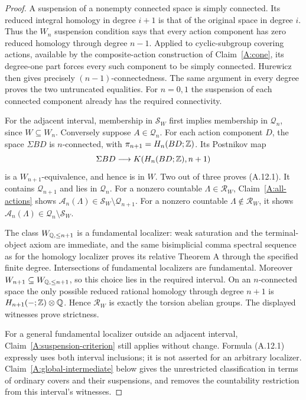 \begin{proof}
A suspension of a nonempty connected space is simply connected. Its reduced integral homology in degree $i+1$ is that of the original space in degree $i$. Thus the $W_n$ suspension condition says that every action component has zero reduced homology through degree $n-1$. Applied to cyclic-subgroup covering actions, available by the composite-action construction of Claim~\ref{A:cone}, its degree-one part forces every such component to be simply connected. Hurewicz then gives precisely $(n-1)$-connectedness. The same argument in every degree proves the two untruncated equalities. For $n=0,1$ the suspension of each connected component already has the required connectivity.

For the adjacent interval, membership in $\mathcal S_W$ first implies membership in $\mathcal Q_n$, since $W\subseteq W_n$. Conversely suppose $A\in\mathcal Q_n$. For each action component $D$, the space $\Sigma BD$ is $n$-connected, with $\pi_{n+1}=H_n(BD;\mathbb Z)$. Its Postnikov map
\[
 \Sigma BD\longrightarrow K(H_n(BD;\mathbb Z),n+1)
\]
is a $W_{n+1}$-equivalence, and hence is in $W$. Two out of three proves (A.12.1). It contains $\mathcal Q_{n+1}$ and lies in $\mathcal Q_n$. For a nonzero countable $\Lambda\in\mathcal R_W$, Claim~\ref{A:all-actions} shows $\mathcal A_n(\Lambda)\in\mathcal S_W\setminus\mathcal Q_{n+1}$. For a nonzero countable $\Lambda\notin\mathcal R_W$, it shows $\mathcal A_n(\Lambda)\in\mathcal Q_n\setminus\mathcal S_W$.

The class $W_{\mathbb Q,\leq n+1}$ is a fundamental localizer: weak saturation and the terminal-object axiom are immediate, and the same bisimplicial comma spectral sequence as for the homology localizer proves its relative Theorem A through the specified finite degree. Intersections of fundamental localizers are fundamental. Moreover $W_{n+1}\subseteq W_{\mathbb Q,\leq n+1}$, so this choice lies in the required interval. On an $n$-connected space the only possible reduced rational homology through degree $n+1$ is $H_{n+1}(-;\mathbb Z)\otimes\mathbb Q$. Hence $\mathcal R_W$ is exactly the torsion abelian groups. The displayed witnesses prove strictness.

For a general fundamental localizer outside an adjacent interval, Claim~\ref{A:suspension-criterion} still applies without change. Formula (A.12.1) expressly uses both interval inclusions; it is not asserted for an arbitrary localizer. Claim~\ref{A:global-intermediate} below gives the unrestricted classification in terms of ordinary covers and their suspensions, and removes the countability restriction from this interval's witnesses.
\end{proof}
